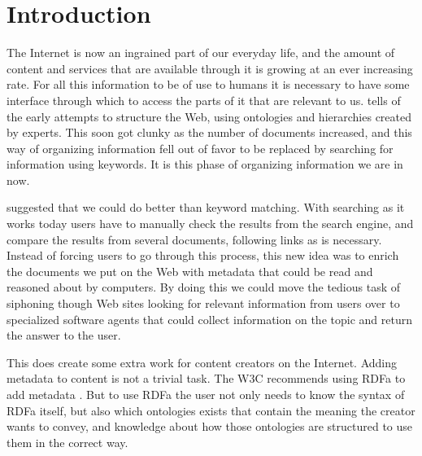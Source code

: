 
\chapter{Introduction} %

\label{Introduction}



The Internet is now an ingrained part of our everyday life,
and the amount of content and services that are available through it is growing at an ever increasing rate.
For all this information to be of use to humans it is necessary to have some interface through which to access the parts of it that are relevant to us.
\citet{Shirky2007} tells of the early attempts to structure the Web,
using ontologies and hierarchies created by experts.
This soon got clunky as the number of documents increased,
and this way of organizing information fell out of favor to be replaced by searching for information using keywords.
It is this phase of organizing information we are in now.

\citet{Berners-Lee2001} suggested that we could do better than keyword matching.
With searching as it works today users have to manually check the results from the search engine,
and compare the results from several documents, following links as is necessary.
Instead of forcing users to go through this process,
this new idea was to enrich the documents we put on the Web with metadata that could be read and reasoned about by computers.
By doing this we could move the tedious task of siphoning though Web sites looking for relevant information from users
over to specialized software agents that could collect information on the topic and return the answer to the user.

This does create some extra work for content creators on the Internet.
Adding metadata to content is not a trivial task.
The W3C recommends using RDFa to add metadata \citep{Pemberton:08:RXS}.
But to use RDFa the user not only needs to know the syntax of RDFa itself,
but also which ontologies exists that contain the meaning the creator wants to convey,
and knowledge about how those ontologies are structured to use them in the correct way.

